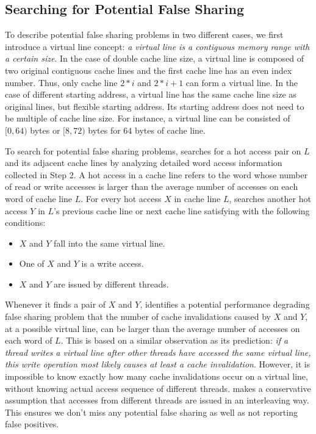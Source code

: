 \subsection{Searching for Potential False Sharing}
\label{sec:evaluatingfs}
To describe potential false sharing problems in two different cases, 
we first introduce a virtual line concept:
{\it a virtual line is a contiguous memory range with a certain size}.
In the case of double cache line size, a virtual line 
is composed of two original 
contiguous cache lines and the first cache line has an even index number.
Thus, only cache line $2*i$ and $2*i+1$ can form a virtual line.
In the case of different starting address,
a virtual line has the same cache line size as original lines, but
flexible starting address.
Its starting address does not need to be multiple of cache line size.
For instance, a virtual line can be consisted of $[0,64)$ bytes or $[8,72)$ bytes 
for $64$ bytes of cache line.

To search for potential false sharing problems, 
\Predator{} searches for a hot access pair on $L$ and its adjacent cache lines 
by analyzing detailed word access information collected in Step 2. 
A hot access in a cache line refers to the word whose number of read or write accesses 
is larger than the average number of accesses on each word of cache line $L$.
For every hot access $X$ in cache line $L$, \Predator{} searches another
hot access $Y$ in $L$'s previous cache line or next cache line satisfying with
the following conditions: 

\begin{itemize}
\item
$X$ and $Y$ fall into the same virtual line. 

\item
One of $X$ and $Y$ is a write access.

\item 
$X$ and $Y$ are issued by different threads.

\end{itemize}

Whenever it finds a pair of $X$ and $Y$, 
\Predator{} identifies a potential performance degrading false sharing problem
that the number of cache invalidations caused by $X$ and $Y$, at a possible virtual line, 
can be larger than the average number of accesses on each word of $L$. 
This is based on a similar observation as its prediction:
{\it if a thread writes a virtual line after other threads 
have accessed the same virtual line, this write operation most likely causes at least a cache 
invalidation}. 
However, it is impossible to know exactly how many cache invalidations occur on a virtual
line, without knowing actual access sequence of different threads.  
\Predator{} makes a conservative assumption that 
accesses from different threads are issued in an interleaving way.
This ensures we don't miss any potential false sharing as well as 
not reporting false positives.

